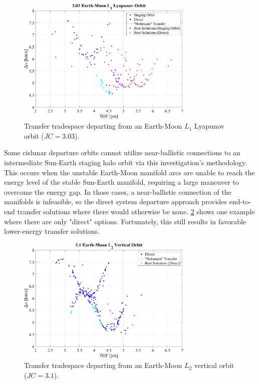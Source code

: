 \begin{figure}[ht]
    \centering
    \includegraphics[width=0.75\textwidth]{figures/TradeSpace_L1Lyapunov_3_03.pdf}
    \caption{Transfer tradespace departing from an Earth-Moon $L_{1}$ Lyapunov orbit ($JC=3.03$).}
    \label{fig:lowBoth}
\end{figure}

Some cislunar departure orbits cannot utilize near-ballistic connections to an intermediate
Sun-Earth staging halo orbit via this investigation's methodology. This occurs when the unstable
Earth-Moon manifold arcs are unable to reach the energy level of the stable Sun-Earth manifold,
requiring a large maneuver to overcome the energy gap. In those cases, a near-ballistic connection
of the manifolds is infeasible, so the direct system departure approach provides end-to-end
transfer solutions where there would otherwise be none. \cref{fig:noStaged} shows one example where
there are only "direct" options. Fortunately, this still results in favorable lower-energy transfer
solutions.

\begin{figure}[ht]
    \centering
    \includegraphics[width=0.75\textwidth]{figures/TradeSpace_L2Vertical_3_10.pdf}
    \caption{Transfer tradespace departing from an Earth-Moon $L_{2}$ vertical orbit ($JC=3.1$).}
    \label{fig:noStaged}
\end{figure}

